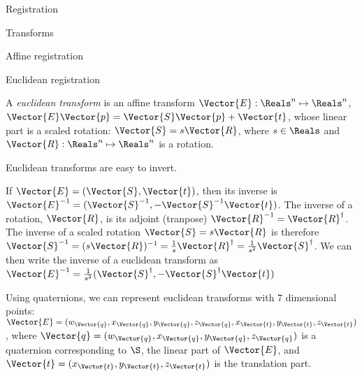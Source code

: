 \begin{plSection}{Registration}
\begin{plSection}{Transforms}
\begin{plSection}{Affine registration}
\end{plSection}%
\begin{plSection}{Euclidean registration}
\label{sec:euclidean-registration}

A {\it euclidean transform} is an affine transform
$\Vector{E} : \Reals^n \mapsto \Reals^n$,
$\Vector{E} \Vector{p} = \Vector{S} \Vector{p} + \Vector{t} $,
whose linear part is a scaled rotation:
$\Vector{S} = s \Vector{R}$,
where $s \in \Reals$ and $\Vector{R} : \Reals^n \mapsto \Reals^n$
is a rotation.

Euclidean transforms are easy to invert.

If $\Vector{E} = (\Vector{S},\Vector{t})$, then its inverse is
$\Vector{E}^{-1} = (\Vector{S}^{-1}, - \Vector{S}^{-1}\Vector{t})$.
The inverse of a rotation, $\Vector{R}$, is its adjoint
(tranpose) $\Vector{R}^{-1} = \Vector{R}^{\dagger}$.
The inverse of a scaled rotation $\Vector{S} = s \Vector{R}$
is therefore
$\Vector{S}^{-1} = (s \Vector{R})^{-1}
         = {1 \over s} \Vector{R}^{\dagger}
         = {1 \over {s^2}} \Vector{S}^{\dagger}$.
We can then write the inverse of a euclidean transform as
$\Vector{E}^{-1} = {1 \over {s^2}}(\Vector{S}^{\dagger}, - \Vector{S}^{\dagger}\Vector{t})$

Using quaternions, we can represent euclidean transforms with
7 dimensional points:
$\Vector{E} = (w_{\Vector{q}}, x_{\Vector{q}}, y_{\Vector{q}}, z_{\Vector{q}}, x_{\Vector{t}}, y_{\Vector{t}}, z_{\Vector{t}})$,
where $\Vector{q} = (w_{\Vector{q}}, x_{\Vector{q}}, y_{\Vector{q}}, z_{\Vector{q}})$ 
is a quaternion corresponding
to $\S$, the linear part of $\Vector{E}$,
and $\Vector{t} = (x_{\Vector{t}}, y_{\Vector{t}}, z_{\Vector{t}})$ is the translation part.


\end{plSection}
\end{plSection}
\end{plSection}
